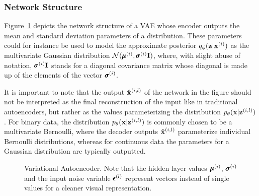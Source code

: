 
\subsubsection{Network Structure}

Figure~\ref{fig:vae} depicts the network structure of a VAE whose encoder outputs the mean and standard deviation parameters of a distribution. These parameters could for instance be used to model the approximate posterior $q_{\phi}(\mathbf{z} \vert \mathbf{x}^{(i)})$ as the multivariate Gaussian distribution $\mathcal{N}(\pmb{\mu}^{(i)}, \pmb{\sigma}^{(i)} \mathbf{I})$, where, with slight abuse of notation, $\pmb{\sigma}^{(i)} \mathbf{I}$ stands for a diagonal covariance matrix whose diagonal is made up of the elements of the vector $\pmb{\sigma}^{(i)}$.

It is important to note that the output $\hat{\mathbf{x}}^{(i,l)}$ of the network in the figure should not be interpreted as the final reconstruction of the input like in traditional autoencoders, but rather as the values parameterizing the distribution $p_{\theta}(\mathbf{x} \vert \mathbf{z}^{(i, l)})$. For binary data, the distribution $p_{\theta}(\mathbf{x} \vert \mathbf{z}^{(i, l)})$ is commonly chosen to be a multivariate Bernoulli, where the decoder outputs $\hat{\mathbf{x}}^{(i,l)}$ parameterize individual Bernoulli distributions, whereas for continuous data the parameters for a Gaussian distribution are typically outputted.



\begin{figure}[!htb]
  \centering
  \resizebox{0.8\textwidth}{!}{\unskip}
  \caption{Variational Autoencoder. Note that the hidden layer values $\pmb{\mu}^{(i)}$, $\pmb{\sigma}^{(i)}$ and the input noise variable $\pmb{\epsilon}^{(l)}$ represent vectors instead of single values for a cleaner visual representation.}
  \label{fig:vae}
\end{figure}

